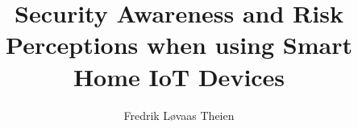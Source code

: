 \documentclass[british,titlepage]{ntnuthesis}
\title{Security Awareness and Risk Perceptions when using Smart Home IoT Devices}
\author{Fredrik Løvaas Theien}
\date{\ntnuthesisdate}
\begin{document}



\tableofcontents
\listoffigures
\listoftables
\lstlistoflistings









\printbibliography

\appendix

\end{document}
